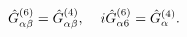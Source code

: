 \begin{equation}
\hat{G}_{\alpha\beta}^{(6)}=\hat{G}_{\alpha\beta}^{(4)}, 
\hspace{0.4cm}
i\hat{G}_{\alpha6}^{(6)}=\hat{G}_{\alpha}^{(4)}. 
\label{so(6)inso(7,1)}
\end{equation}

